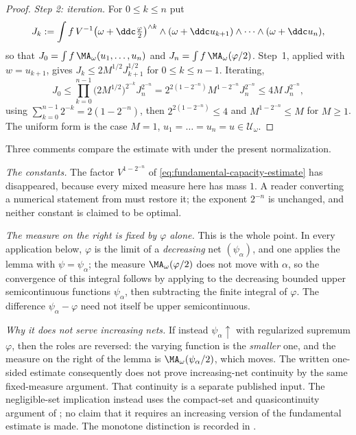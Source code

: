 \begin{proof}
\emph{Step 2: iteration.}  For $0\le k\le n$ put
\[
 J_k:=\int f\,V^{-1}\bigl(\omega+\ddc\tfrac\varphi2\bigr)^{\wedge k}
   \wedge(\omega+\ddc u_{k+1})\wedge\cdots\wedge(\omega+\ddc u_n),
\]
so that $J_0=\int f\,\MA_\omega(u_1,\dots,u_n)$ and
$J_n=\int f\,\MA_\omega(\varphi/2)$.  Step~1, applied with
$w=u_{k+1}$, gives $J_k\le2M^{1/2}J_{k+1}^{1/2}$ for
$0\le k\le n-1$.  Iterating,
\[
 J_0\le\prod_{k=0}^{n-1}\bigl(2M^{1/2}\bigr)^{2^{-k}}J_n^{2^{-n}}
 =2^{2(1-2^{-n})}M^{1-2^{-n}}J_n^{2^{-n}}
 \le 4M\,J_n^{2^{-n}},
\]
using $\sum_{k=0}^{n-1}2^{-k}=2(1-2^{-n})$, then
$2^{2(1-2^{-n})}\le4$ and $M^{1-2^{-n}}\le M$ for $M\ge1$.  The
uniform form is the case $M=1$, $u_1=\dots=u_n=u\in\mathcal U_\omega$.
\end{proof}

\begin{remark}
\label{rem:ch48-fundamental-transfer}
Three comments compare the estimate with
 under the present normalization.

\emph{The constants.}  The factor $V^{1-2^{-n}}$ of
\eqref{eq:fundamental-capacity-estimate} has disappeared, because every
mixed measure here has mass $1$.  A reader converting a numerical
statement from  must restore it; the exponent
$2^{-n}$ is unchanged, and neither constant is claimed to be optimal.

\emph{The measure on the right is fixed by $\varphi$ alone.}  This is the
whole point.  In every application below, $\varphi$ is the limit of a
\emph{decreasing} net $(\psi_\alpha)$, and one applies the lemma with
$\psi=\psi_\alpha$; the measure $\MA_\omega(\varphi/2)$ does not move
with $\alpha$, so
the convergence of this integral follows by applying
 to the decreasing bounded
upper semicontinuous functions $\psi_\alpha$, then subtracting
the finite integral of $\varphi$. The difference
$\psi_\alpha-\varphi$ need not itself be upper semicontinuous.

\emph{Why it does not serve increasing nets.}  If instead
$\psi_\alpha\uparrow$ with regularized supremum $\varphi$, then the
roles are reversed: the varying function is the \emph{smaller} one, and the
measure on the right of the lemma is $\MA_\omega(\psi_\alpha/2)$, which
moves. The written one-sided estimate consequently does not prove
increasing-net continuity by the same fixed-measure argument.
That continuity is a separate published input. The negligible-set
implication instead uses the compact-set and quasicontinuity argument
of \cite[Lemma~13.19]{BJ22}; no claim that it requires an increasing
version of the fundamental estimate is made. The monotone distinction
is recorded in .
\end{remark}

